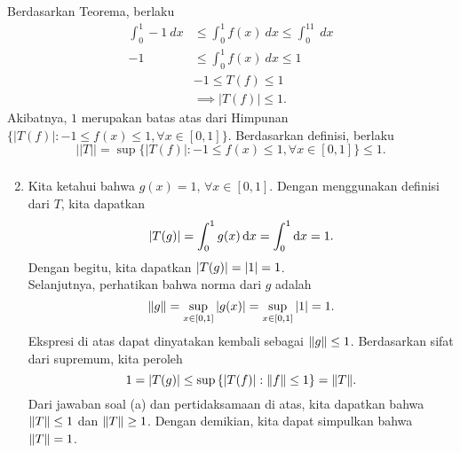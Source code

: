 \documentclass[aspectratio=169]{beamer}
\theoremstyle{definition}
\begin{document}
\begin{frame}
  \frametitle{\insertsection}
  \framesubtitle{\insertsubsection}
  Berdasarkan Teorema, berlaku
  \begin{align*}
    \int_0^1-1\ dx & \leq\int_0^1f(x)\ dx\leq\int_0^11\ dx \\
    -1             & \leq\int_0^1f(x)\ dx\leq1             \\
                   & -1\leq T(f)\leq1                      \\
                   & \implies|T(f)|\leq1.
  \end{align*}
  Akibatnya, $1$ merupakan batas atas dari Himpunan $\{|T(f)|:-1\leq f(x)\leq1,\forall x\in [0,1]\}$. Berdasarkan definisi, berlaku
  $$||T||=\sup\{|T(f)|:-1\leq f(x)\leq1,\forall x\in [0,1]\}\leq1.$$
\end{frame}
\begin{frame}
  \frametitle{\insertsection}
  \framesubtitle{\insertsubsection}
  \begin{enumerate}
    \setcounter{enumi}{1}
    \item Kita ketahui bahwa \(g(x) = 1,\,\forall x \in [0,1]\). Dengan menggunakan definisi dari \(T\), kita dapatkan
          \begin{equation*}
            \abs{T(g)} = \int_0^1g(x)\,\dd x = \int_0^1 \dd x = 1.
          \end{equation*}
          Dengan begitu, kita dapatkan \(\abs{T(g)} = \abs{1} = 1\). \\
          Selanjutnya, perhatikan bahwa norma dari \(g\) adalah
          \begin{equation*}
            \norm{g} = \sup_{x\in [0,1]}\abs{g(x)} = \sup_{x\in [0,1]} \abs{1} = 1.
          \end{equation*}
          Ekspresi di atas dapat dinyatakan kembali sebagai \(\norm{g} \leq 1\). Berdasarkan sifat dari supremum, kita peroleh
          \begin{equation*}
            1 = \abs{T(g)} \leq \sup\qty{\abs{T(f)}:\norm{f}\leq 1} = \norm{T}.
          \end{equation*}
          Dari jawaban soal (a) dan pertidaksamaan di atas, kita dapatkan bahwa \(\norm{T} \leq 1\) dan \(\norm{T} \geq 1\). Dengan demikian, kita dapat simpulkan bahwa \(\norm{T} = 1\).
  \end{enumerate}
\end{frame}
\end{document}
